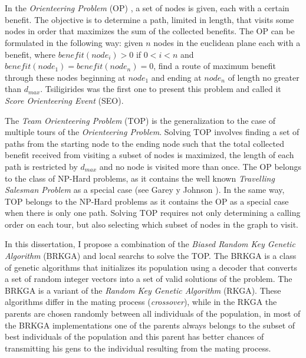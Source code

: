 
\chapter*{\tituloAbstractEn}

\noindent In the \textit{Orienteering Problem} (OP) \cite{Tsiligirides}, a set of nodes is given, each with a certain benefit. The objective is to determine a path, limited in length, that visits some nodes in order that maximizes the sum of the collected benefits. The OP can be formulated in the following way: given $n$ nodes in the euclidean plane each with a benefit, where $benefit(node_i) > 0$ if $0 < i < n$ and $benefit(node_1) = benefit(node_n) = 0$, find a route of maximum benefit through these nodes beginning at $node_1$ and ending at $node_n$ of length no greater than $d_{max}$. Tsiligirides \cite{Tsiligirides} was the first one to present this problem and called it \textit{Score Orienteering Event} (SEO).

\bigskip

The \textit{Team Orienteering Problem} (TOP) \cite{ChaoGoldenWasil} is the generalization to the case of multiple tours of the \textit{Orienteering Problem}. Solving TOP involves finding a set of paths from the starting node to the ending node such that the total collected benefit received from visiting a subset of nodes is maximized, the length of each path is restricted by $d_{max}$ and no node is visited more than once. The OP belongs to the class of NP-Hard problems, as it contains the well known \textit{Travelling Salesman Problem} as a special case (see Garey y Johnson \cite{GareyJohnson}). In the same way, TOP belongs to the NP-Hard problems as it contains the OP as a special case when there is only one path. Solving TOP requires not only determining a calling order on each tour, but also selecting which subset of nodes in the graph to visit.

\bigskip

In this dissertation, I propose a combination of the \textit{Biased Random Key Genetic Algorithm} (BRKGA) \cite{Bean} and local searchs to solve the TOP. The BRKGA is a class of genetic algorithms that initializes its population using a decoder that converts a set of random integer vectors into a set of valid solutions of the problem. The BRKGA is a variant of the \textit{Random Key Genetic Algorithm} (RKGA). These algorithms differ in the mating process (\textit{crossover}), while in the RKGA the parents are chosen randomly between all individuals of the population, in most of the BRKGA implementations one of the parents always belongs to the subset of best individuals of the population and this parent has better chances of transmitting his gens to the individual resulting from the mating process.

